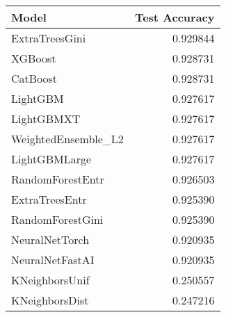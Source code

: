 \begin{tabular}{lr}
\toprule
Model & Test Accuracy \\
\midrule
ExtraTreesGini & 0.929844 \\
XGBoost & 0.928731 \\
CatBoost & 0.928731 \\
LightGBM & 0.927617 \\
LightGBMXT & 0.927617 \\
WeightedEnsemble_L2 & 0.927617 \\
LightGBMLarge & 0.927617 \\
RandomForestEntr & 0.926503 \\
ExtraTreesEntr & 0.925390 \\
RandomForestGini & 0.925390 \\
NeuralNetTorch & 0.920935 \\
NeuralNetFastAI & 0.920935 \\
KNeighborsUnif & 0.250557 \\
KNeighborsDist & 0.247216 \\
\bottomrule
\end{tabular}
